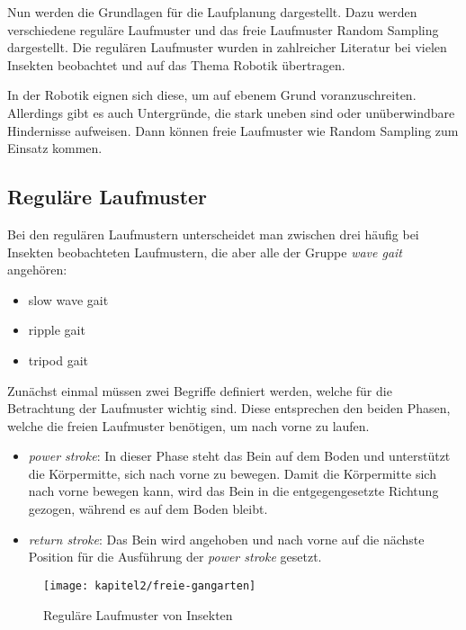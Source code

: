 Nun werden die Grundlagen für die Laufplanung dargestellt. Dazu werden verschiedene reguläre Laufmuster und das freie Laufmuster Random Sampling dargestellt. Die regulären Laufmuster wurden in zahlreicher Literatur bei vielen Insekten beobachtet und auf das Thema Robotik übertragen. \autocite{ferrell1995comparison, wilson1966insect}

In der Robotik eignen sich diese, um auf ebenem Grund voranzuschreiten. Allerdings gibt es auch Untergründe, die stark uneben sind oder unüberwindbare Hindernisse aufweisen. Dann können freie Laufmuster wie Random Sampling zum Einsatz kommen.

\subsection{Reguläre Laufmuster}

Bei den regulären Laufmustern unterscheidet man zwischen drei häufig bei Insekten beobachteten Laufmustern, die aber alle der Gruppe \emph{wave gait} angehören:
\begin{itemize}
\item slow wave gait
\item ripple gait
\item tripod gait
\end{itemize}

Zunächst einmal müssen zwei Begriffe definiert werden, welche für die Betrachtung der Laufmuster wichtig sind. Diese entsprechen den beiden Phasen, welche die freien Laufmuster benötigen, um nach vorne zu laufen.
\begin{itemize}
\item \emph{power stroke}: In dieser Phase steht das Bein auf dem Boden und unterstützt die Körpermitte, sich nach vorne zu bewegen. Damit die Körpermitte sich nach vorne bewegen kann, wird das Bein in die entgegengesetzte Richtung gezogen, während es auf dem Boden bleibt.
\item \emph{return stroke}: Das Bein wird angehoben und nach vorne auf die nächste Position für die Ausführung der \emph{power stroke} gesetzt.
\end{itemize}

\begin{figure}[b!]
  \centering
  \texttt{[image: kapitel2/freie-gangarten]}
  \caption[Reguläre Laufmuster von Insekten]{Reguläre Laufmuster von Insekten \autocite{ferrell1995comparison} \autocite{wilson1966insect}}
  \label{Kap2:laufmuster}
\end{figure}

